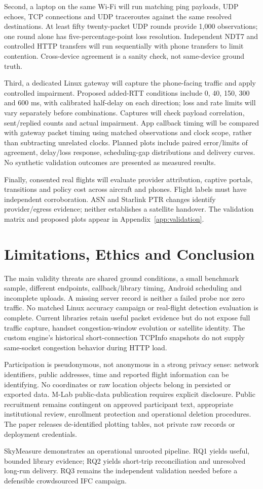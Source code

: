 Second, a laptop on the same Wi-Fi will run matching ping payloads, UDP echoes,
TCP connections and UDP traceroutes against the same resolved destinations.
At least fifty twenty-packet UDP rounds provide 1,000 observations; one round
alone has five-percentage-point loss resolution. Independent NDT7 and controlled
HTTP transfers will run sequentially with phone transfers to limit contention.
Cross-device agreement is a sanity check, not same-device ground truth.

Third, a dedicated Linux gateway will capture the phone-facing traffic and apply
controlled impairment. Proposed added-RTT conditions include 0, 40, 150, 300 and
600 ms, with calibrated half-delay on each direction; loss and rate limits will
vary separately before combinations. Captures will check payload correlation,
sent/replied counts and actual impairment. App callback timing will be compared
with gateway packet timing using matched observations and clock scope, rather
than subtracting unrelated clocks. Planned plots include paired error/limits
of agreement, delay/loss response, scheduling-gap distributions and delivery
curves. No synthetic validation outcomes are presented as measured results.

Finally, consented real flights will evaluate provider attribution, captive
portals, transitions and policy cost across aircraft and phones. Flight labels
must have independent corroboration. ASN and Starlink PTR changes identify
provider/egress evidence; neither establishes a satellite handover. The validation
matrix and proposed plots appear in Appendix~\ref{app:validation}.

\section{Limitations, Ethics and Conclusion}
The main validity threats are shared ground conditions, a small benchmark sample,
different endpoints, callback/library timing, Android scheduling and incomplete
uploads. A missing server record is neither a failed probe nor zero traffic.
No matched Linux accuracy campaign or real-flight detection evaluation is
complete. Current libraries retain useful packet evidence but do not expose
full traffic capture, handset congestion-window evolution or satellite identity.
The custom engine's historical short-connection TCPInfo snapshots do not supply
same-socket congestion behavior during HTTP load.

Participation is pseudonymous, not anonymous in a strong privacy sense: network
identifiers, public addresses, time and reported flight information can be
identifying. No coordinates or raw location objects belong in persisted or
exported data. M-Lab public-data publication requires explicit disclosure.
Public recruitment remains contingent on approved participant text, appropriate
institutional review, enrollment protection and operational deletion procedures.
The paper releases de-identified plotting tables, not private raw records or
deployment credentials.

SkyMeasure demonstrates an operational unrooted pipeline. RQ1 yields useful,
bounded library evidence; RQ2 yields short-trip reconciliation and unresolved
long-run delivery. RQ3 remains the independent validation needed before a
defensible crowdsourced IFC campaign.
